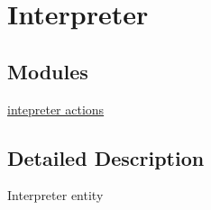 \hypertarget{group__Interpreter}{\section{Interpreter}
\label{group__Interpreter}
}
\subsection*{Modules}
\begin{DoxyCompactItemize}
\item 
\hyperlink{group__interpreter__actions}{intepreter actions}
\end{DoxyCompactItemize}


\subsection{Detailed Description}
Interpreter entity 